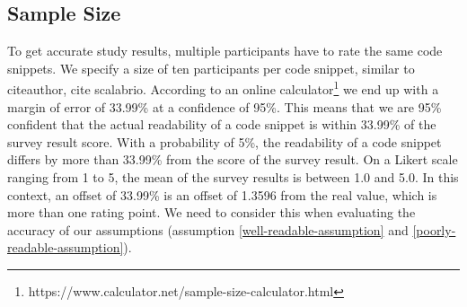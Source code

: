 \documentclass[%
class=scrreprt,
chapterprefix=false,%
open=right,%
twoside=false,%
paper=a4,%
logofile={Logo\_zentral\_farbig\_EN.png},%
thesistype=masterproposal,%
UKenglish,%
]{se2thesis}
\begin{document}
\subsection{Sample Size}
To get accurate study results, multiple participants have to rate the same code snippets. We specify a size of ten participants per code snippet, similar to citeauthor, cite scalabrio. According to an online calculator\footnote{https://www.calculator.net/sample-size-calculator.html} we end up with a margin of error of 33.99\% at a confidence of 95\%. This means that we are 95\% confident that the actual readability of a code snippet is within 33.99\% of the survey result score. With a probability of 5\%, the readability of a code snippet differs by more than 33.99\% from the score of the survey result. On a Likert scale ranging from 1 to 5, the mean of the survey results is between 1.0 and 5.0. In this context, an offset of 33.99\% is an offset of 1.3596 from the real value, which is more than one rating point. We need to consider this when evaluating the accuracy of our assumptions (assumption \ref{well-readable-assumption} and \ref{poorly-readable-assumption}).




\end{document}
